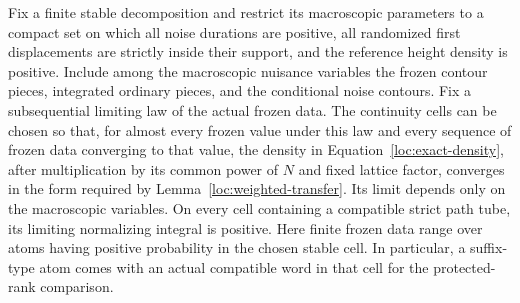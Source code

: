 \begin{proposition}
\label{loc:macroscopic-density}
Fix a finite stable decomposition and restrict its macroscopic
parameters to a compact set on which all noise durations are positive,
all randomized first displacements are strictly inside their support,
and the reference height density is positive.  Include among the
macroscopic nuisance variables the frozen contour pieces, integrated
ordinary pieces, and the conditional noise contours.  Fix a subsequential
limiting law of the actual frozen data.  The continuity cells can be
chosen so that, for almost every frozen value under this law and every
sequence of frozen data converging to that value, the density in
Equation~\eqref{loc:exact-density}, after multiplication by its common
power of $N$ and fixed lattice factor, converges in the form required by
Lemma~\ref{loc:weighted-transfer}.  Its limit depends only on the
macroscopic variables.  On every cell containing a compatible strict
path tube, its limiting normalizing integral is positive.  Here finite
frozen data range over atoms having positive probability in the chosen
stable cell.  In particular, a suffix-type atom comes with an actual
compatible word in that cell for the protected-rank comparison.
\end{proposition}
